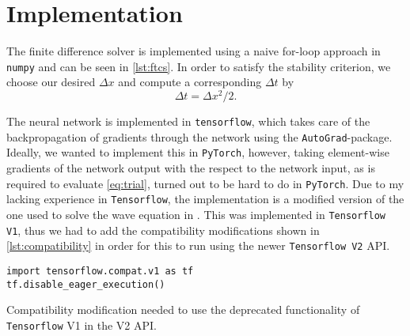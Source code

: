 \documentclass[article, a4paper, oneside]{memoir}
\begin{document}
	\chapter{Implementation}
	
	The finite difference solver is implemented using a naive for-loop
	approach in \texttt{numpy} and can be seen in \cref{lst:ftcs}. In order
	to satisfy the stability criterion, we choose our desired \( \Delta x
	\) and compute a corresponding \( \Delta t\) by
	\begin{equation}
		\Delta t = \Delta x^2 / 2.
	\end{equation}

	The neural network is implemented in \texttt{tensorflow}, which takes
	care of the backpropagation of gradients through the network using the
	\texttt{AutoGrad}-package. Ideally, we wanted to implement this in
	\texttt{PyTorch}, however, taking element-wise gradients of the network
	output with the respect to the network input, as is required to
	evaluate \cref{eq:trial}, turned out to be hard to do in
	\texttt{PyTorch}. Due to my lacking experience in \texttt{Tensorflow},
	the implementation is a modified version of the one used to solve the
	wave equation in \cite{heinDataAnalysisMachine}. This was implemented
	in \texttt{Tensorflow V1}, thus we had to add the compatibility
	modifications shown in \cref{lst:compatibility} in order for this to
	run using the newer \texttt{Tensorflow V2} API.
	
	\begin{listing}
		\centering	
		\begin{verbatim}
import tensorflow.compat.v1 as tf
tf.disable_eager_execution()		
		\end{verbatim}
		\caption{Compatibility modification needed to use the
		deprecated functionality of \texttt{Tensorflow} V1 in the V2
	API.}
		\label{lst:compatibility}
	\end{listing}
\end{document}
